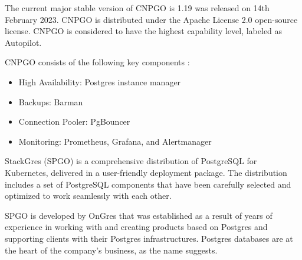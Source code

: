 The current major stable version of CNPGO is 1.19 was released on 14th February 2023. CNPGO is distributed under the Apache License 2.0 open-source license. CNPGO is considered to have the highest capability level, labeled as Autopilot. \cite{CNPGdocu}

CNPGO consists of the following key components \cite{PostgresOnKubernetes} \cite{CNPGdocuQuickstart}:
\begin{itemize}
  \item High Availability: Postgres instance manager
  \item Backups: Barman
  \item Connection Pooler: PgBouncer
  \item Monitoring: Prometheus, Grafana, and Alertmanager
\end{itemize}


\pagebreak
{}
StackGres (SPGO) is a comprehensive distribution of PostgreSQL for Kubernetes, delivered in a user-friendly deployment package. The distribution includes a set of PostgreSQL components that have been carefully selected and optimized to work seamlessly with each other. \cite{SPGOgitlab}

SPGO is developed by OnGres that was established as a result of years of experience in working with and creating products based on Postgres and supporting clients with their Postgres infrastructures. Postgres databases are at the heart of the company's business, as the name suggests. \cite{OnGres}

